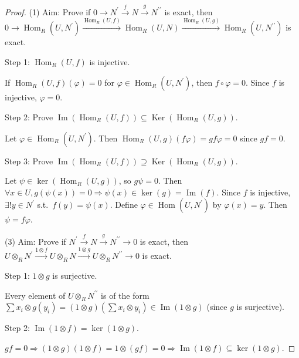 \documentclass[11pt, a4paper]{report}
\begin{document}
\begin{proof}
(1) Aim: Prove if $0 \rightarrow N^{\prime} \xrightarrow{f} N \xrightarrow{g} N^{\prime \prime}$ is exact, then $0 \rightarrow \operatorname{Hom}_{R}\left(U, N^{\prime}\right) \xrightarrow{\operatorname{Hom}_{R}(U, f)} \operatorname{Hom}_{R}(U, N) \xrightarrow{\operatorname{Hom}_{R}(U, g)} \operatorname{Hom}_{R}\left(U, N^{\prime \prime}\right)$ is exact.

Step 1: $\operatorname{Hom}_{R}(U, f)$ is injective.

If $\operatorname{Hom}_{R}(U, f)(\varphi)=0$ for $\varphi \in \operatorname{Hom}_{R}\left(U, N^{\prime}\right)$, then $f \circ \varphi = 0$. Since $f$ is injective, $\varphi=0$.

Step 2: Prove $\operatorname{Im}\left(\operatorname{Hom}_{R}(U, f)\right) \subseteq \operatorname{Ker}\left(\operatorname{Hom}_{R}(U, g)\right)$.

Let $\varphi \in \operatorname{Hom}_{R}\left(U, N^{\prime}\right)$. Then $\operatorname{Hom}_{R}(U, g)(f \varphi)=g f \varphi=0$ since $g f=0$.

Step 3: Prove $\operatorname{Im}\left(\operatorname{Hom}_{R}(U, f)\right) \supseteq \operatorname{Ker}\left(\operatorname{Hom}_{R}(U, g)\right)$.

Let $\psi \in \operatorname{ker}\left(\operatorname{Hom}_{R}(U, g)\right)$, so $g \psi=0$. Then $\forall x \in U, g(\psi(x))=0 \Rightarrow \psi(x) \in \operatorname{ker}(g)=\operatorname{Im}(f)$. Since $f$ is injective, $\exists! y \in N^{\prime}$ s.t.\ $f(y)=\psi(x)$. Define $\varphi \in \operatorname{Hom}\left(U, N^{\prime}\right)$ by $\varphi(x)=y$. Then $\psi=f \varphi$.

(3) Aim: Prove if $N^{\prime} \xrightarrow{f} N \xrightarrow{g} N^{\prime \prime} \rightarrow 0$ is exact, then $U \otimes_{R} N^{\prime} \xrightarrow{1 \otimes f} U \otimes_{R} N \xrightarrow{1 \otimes g} U \otimes_{R} N^{\prime \prime} \rightarrow 0$ is exact.

Step 1: $1 \otimes g$ is surjective.

Every element of $U \otimes_{R} N^{\prime \prime}$ is of the form $\sum x_{i} \otimes g\left(y_{i}\right)=(1 \otimes g)\left(\sum x_{i} \otimes y_{i}\right) \in \operatorname{Im}(1 \otimes g)$ (since $g$ is surjective).

Step 2: $\operatorname{Im}(1 \otimes f)=\operatorname{ker}(1 \otimes g)$.

$g f=0 \Rightarrow(1 \otimes g)(1 \otimes f)=1 \otimes(g f)=0 \Rightarrow \operatorname{Im}(1 \otimes f) \subseteq \operatorname{ker}(1 \otimes g)$.


\end{proof}
\end{document}
